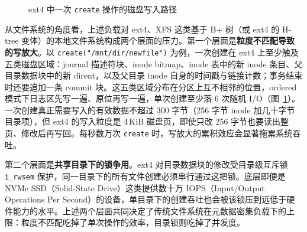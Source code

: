 \begin{figure}[htbp]
    \caption{ext4 中一次 \texttt{create} 操作的磁盘写入路径}
    \label{fig:ext4-create-path}
\end{figure}

从文件系统的角度看，上述负载对 ext4、XFS 这类基于 B+ 树（或 ext4 的 H-tree 变体）的本地文件系统构成两个层面的压力。第一个层面是\textbf{粒度不匹配导致的写放大}。以 \texttt{create("/mnt/dir/newfile")} 为例，一次创建在 ext4 上至少触及五类磁盘区域：journal 描述符块、inode bitmap、inode 表中的新 inode 条目、父目录数据块中的新 dirent，以及父目录 inode 自身的时间戳与链接计数；事务结束时还要追加一条 commit 块。这五类区域分布在分区上互不相邻的位置，ordered 模式下日志区先写一遍、原位再写一遍，单次创建至少落 6 次随机 I/O（图~\ref{fig:ext4-create-path}）。一次创建真正需要写入的有效数据不超过 300 字节（256 字节 inode 加几十字节目录项），但 ext4 的写入粒度是 4\,KiB 磁盘页，即使只改 256 字节也要读出整页、修改后再写回。每秒数万次 \texttt{create} 时，写放大的累积效应会显著拖累系统吞吐。

第二个层面是\textbf{共享目录下的锁争用}。ext4 对目录数据块的修改受目录级互斥锁 \texttt{i\_rwsem} 保护，同一目录下的所有文件创建必须串行通过这把锁。底层即便是 NVMe SSD（Solid-State Drive）这类提供数十万 IOPS（Input/Output Operations Per Second）的设备，单目录下的创建吞吐也会被该锁压到远低于硬件能力的水平。上述两个层面共同决定了传统文件系统在元数据密集负载下的上限：粒度不匹配吃掉了单次操作的效率，目录锁则吃掉了并发度。

